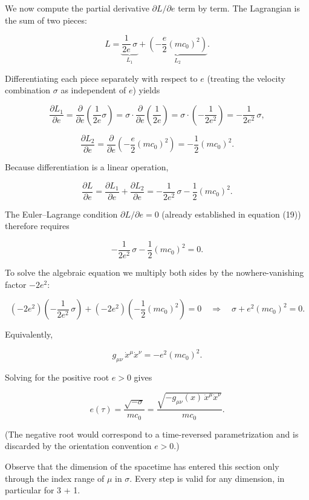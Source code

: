 \documentclass[
]{article}
\begin{document}
We now compute the partial derivative \(\partial L / \partial e\) term
by term. The Lagrangian is the sum of two pieces:

\[L = \underbrace{\frac{1}{2e}\, \sigma}_{L_{1}} + \underbrace{\left( - \frac{e}{2}(mc_{0})^{2} \right)}_{L_{2}}.\]

Differentiating each piece separately with respect to \(e\) (treating
the velocity combination \(\sigma\) as independent of \(e\)) yields

\[\frac{\partial L_{1}}{\partial e} = \frac{\partial}{\partial e} \left( \frac{1}{2e} \sigma \right) = \sigma \cdot \frac{\partial}{\partial e}\left( \frac{1}{2e} \right) = \sigma \cdot \left( - \frac{1}{2e^{2}} \right) = - \frac{1}{2e^{2}}\, \sigma, \tag{20}\]

\[\frac{\partial L_{2}}{\partial e} = \frac{\partial}{\partial e} \left( - \frac{e}{2}(mc_{0})^{2} \right) = - \frac{1}{2}(mc_{0})^{2}. \tag{21}\]

Because differentiation is a linear operation,

\[\frac{\partial L}{\partial e} = \frac{\partial L_{1}}{\partial e} + \frac{\partial L_{2}}{\partial e} = - \frac{1}{2e^{2}}\, \sigma - \frac{1}{2}(mc_{0})^{2}. \tag{22}\]

The Euler--Lagrange condition \(\partial L / \partial e = 0\) (already
established in equation (19)) therefore requires

\[- \frac{1}{2e^{2}}\, \sigma - \frac{1}{2}(mc_{0})^{2} = 0. \tag{23}\]

To solve the algebraic equation we multiply both sides by the
nowhere-vanishing factor \(-2e^{2}\):

\[\left( -2e^{2} \right) \left( - \frac{1}{2e^{2}}\, \sigma \right) + \left( -2e^{2} \right) \left( - \frac{1}{2}(mc_{0})^{2} \right) = 0
\quad \Longrightarrow \quad \sigma + e^{2}(mc_{0})^{2} = 0. \tag{24}\]

Equivalently,

\[g_{\mu\nu}\, \dot{x}^{\mu} \dot{x}^{\nu} = - e^{2} (mc_{0})^{2}. \tag{25}\]

Solving for the positive root \(e > 0\) gives

\[e(\tau) = \frac{\sqrt{-\sigma}}{mc_{0}} = \frac{\sqrt{-g_{\mu\nu}(x)\, \dot{x}^{\mu} \dot{x}^{\nu}}}{mc_{0}}. \tag{26}\]

(The negative root would correspond to a time-reversed parametrization
and is discarded by the orientation convention \(e > 0\).)

Observe that the dimension of the spacetime has entered this section
only through the index range of \(\mu\) in \(\sigma\). Every step is
valid for any dimension, in particular for 3 + 1.
\end{document}
